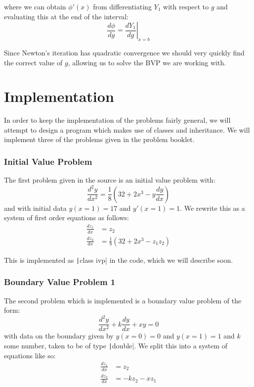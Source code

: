 \documentclass[a4paper,11pt]{report}
\begin{document}
where we can obtain $\phi'(x)$ from differentiating $Y_1$ with respect to $g$ and evaluating this at the end of the interval:
\begin{equation}
	\frac{d \phi}{dg} = \left. \frac{d Y_1}{dg} \right|_{x = b}
\end{equation}

Since Newton's iteration has quadratic convergence we should very quickly find the correct value of $g$, allowing us to solve the BVP we are working with.

\chapter{Implementation}

In order to keep the implementation of the problems fairly general, we will attempt to design a program which makes use of classes and inheritance. We will implement three of the problems given in the problem booklet.

\subsection*{Initial Value Problem}

The first problem given in the source is an initial value problem with:
\begin{equation} \label{ivp-1}
	\frac{d^2 y}{dx^2} = \frac{1}{8} \left(32 + 2x^3 - y \frac{dy}{dx} \right)
\end{equation}
and with initial data $y(x=1)=17$ and $y'(x=1)=1$. We rewrite this as a system of first order equations as follows:
\begin{equation}\label{ivp-1-split}
	\begin{aligned}
		\frac{d z_1}{dx} &= z_2 \\
		\frac{d z_2}{dx} &= \frac{1}{8} \left(32 + 2x^3 - z_1 z_2 \right)
	\end{aligned}
\end{equation}

This is implemented as \texttt|class ivp| in the code, which we will describe soon.

\subsection*{Boundary Value Problem 1}

The second problem which is implemented is a boundary value problem of the form:
\begin{equation} \label{bvp-1}
	\frac{d^2y}{dx^2} + k \frac{dy}{dx} + xy = 0
\end{equation}
with data on the boundary given by $y(x=0) = 0$ and $y(x=1) = 1$ and $k$ some number, taken to be of type \texttt|double|. We split this into a system of equations like so:
\begin{equation} \label{bvp-1-split}
	\begin{aligned}
		\frac{d z_1}{dx} &= z_2 \\
		\frac{d z_2}{dx} &= -k z_2 - x z_1
	\end{aligned}
\end{equation}
\end{document}
